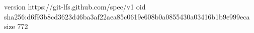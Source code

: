 version https://git-lfs.github.com/spec/v1
oid sha256:d6f93b8cd3623d46ba3af22aea85c0619e608b0a0855430a03416b1b9e999eca
size 772
